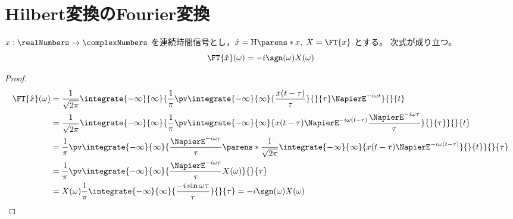     \chapter{Hilbert変換のFourier変換}
        \begin{shadebox}
            $x:\realNumbers\to\complexNumbers$ を連続時間信号とし，$\hat{x} = \HilbertTransform{x},\;X = \FT{x}$ とする。
            次式が成り立つ。
            \[ \FT{\hat{x}}(\omega) = -i\sgn(\omega)X(\omega) \]
        \end{shadebox}
        \begin{proof}
            \begin{align*}
                \FT{\hat{x}}(\omega) &= \frac{1}{\sqrt{2\pi}}\integrate{-\infty}{\infty}{\frac{1}{\pi}\pv\integrate{-\infty}{\infty}{\frac{x(t-\tau)}{\tau}}{}{\tau}\NapierE^{-i\omega t}}{}{t} \\
                &= \frac{1}{\sqrt{2\pi}}\integrate{-\infty}{\infty}{\frac{1}{\pi}\pv\integrate{-\infty}{\infty}{x(t-\tau)\NapierE^{-i\omega(t-\tau)}\frac{\NapierE^{-i\omega \tau}}{\tau}}{}{\tau}}{}{t} \\
                &= \frac{1}{\pi}\pv\integrate{-\infty}{\infty}{\frac{\NapierE^{-i\omega \tau}}{\tau}\parens*{\frac{1}{\sqrt{2\pi}}\integrate{-\infty}{\infty}{x(t-\tau)\NapierE^{-i\omega(t-\tau)}}{}{t}}}{}{\tau} \\
                &= \frac{1}{\pi}\pv\integrate{-\infty}{\infty}{\frac{\NapierE^{-i\omega \tau}}{\tau}X(\omega)}{}{\tau} \\
                &= X(\omega)\frac{1}{\pi}\integrate{-\infty}{\infty}{\frac{-i\sin\omega\tau}{\tau}}{}{\tau} = -i\sgn(\omega)X(\omega)
            \end{align*}
        \end{proof}